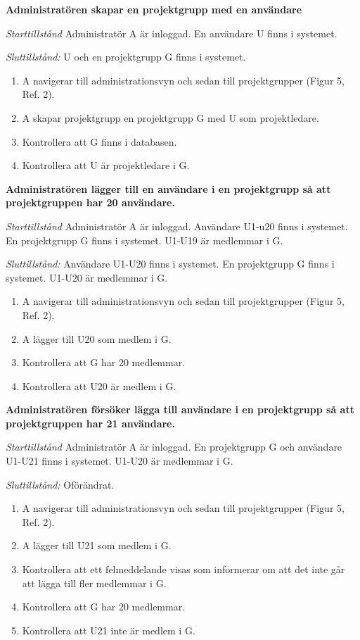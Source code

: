 \documentclass[a4paper]{article}
\begin{document}
\begin{FT}
\item
\textbf{Administratören skapar en projektgrupp med en användare}

\emph{Starttillstånd} Administratör A är inloggad. En användare U finns i systemet. 

\emph{Sluttillstånd:} U och en projektgrupp G finns i systemet.

\begin{enumerate}
\item A navigerar till administrationsvyn och sedan till projektgrupper (Figur 5, Ref. 2).
\item A skapar projektgrupp en projektgrupp G med U som projektledare.
\item Kontrollera att G finns i databasen.
\item Kontrollera att U är projektledare i G.
\end{enumerate}

\item
\textbf{Administratören lägger till en användare i en projektgrupp så att projektgruppen har 20 användare.}

\emph{Starttillstånd} Administratör A är inloggad. Användare U1-u20 finns i systemet. En projektgrupp G finns i systemet. U1-U19 är medlemmar i G.

\emph{Sluttillstånd:} Användare U1-U20 finns i systemet. En projektgrupp G finns i systemet. U1-U20 är medlemmar i G.

\begin{enumerate}
\item A navigerar till administrationsvyn och sedan till projektgrupper (Figur 5, Ref. 2).
\item A lägger till U20 som medlem i G.
\item Kontrollera att G har 20 medlemmar.
\item Kontrollera att U20 är medlem i G.
\end{enumerate}

\item
\textbf{Administratören försöker lägga till användare i en projektgrupp så att projektgruppen har 21 användare.}

\emph{Starttillstånd} Administratör A är inloggad. En projektgrupp G och användare U1-U21 finns i systemet. U1-U20 är medlemmar i G.

\emph{Sluttillstånd:} Oförändrat.

\begin{enumerate}
\item A navigerar till administrationsvyn och sedan till projektgrupper (Figur 5, Ref. 2).
\item A lägger till U21 som medlem i G.
\item Kontrollera att ett felmeddelande visas som informerar om att det inte går att lägga till fler medlemmar i G.
\item Kontrollera att G har 20 medlemmar.
\item Kontrollera att U21 inte är medlem i G.
\end{enumerate}


\end{FT}
\end{document}
